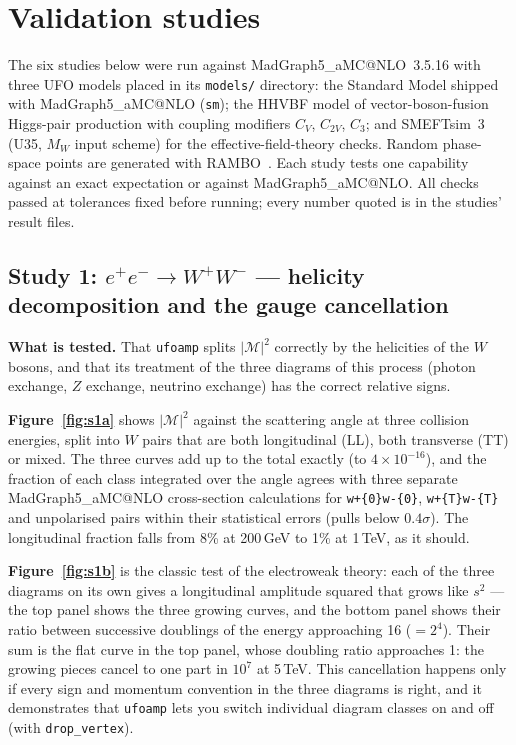 \documentclass[11pt]{article}
\makeatletter
\newcommand{\ufoamp}{\texttt{ufoamp}}
\newcommand{\mg}{MadGraph5\_aMC@NLO}
\newcommand{\code}[1]{\texttt{#1}}
\newcommand{\M}{\mathcal{M}}
\makeatother
\begin{document}
\section{Validation studies}\label{sec:studies}
The six studies below were run against \mg{}~3.5.16 with three UFO models placed in its \code{models/} directory: the Standard Model shipped with \mg{} (\code{sm}); the HHVBF model of vector-boson-fusion Higgs-pair production with coupling modifiers $C_V$, $C_{2V}$, $C_3$; and SMEFTsim~3~\cite{Brivio:2020onw} (U35, $M_W$ input scheme) for the effective-field-theory checks. Random phase-space points are generated with RAMBO~\cite{Kleiss:1985gy}. Each study tests one capability against an exact expectation or against \mg. All checks passed at tolerances fixed before running; every number quoted is in the studies' result files.

\subsection{Study 1: $e^+e^-\to W^+W^-$ --- helicity decomposition and the gauge cancellation}
\textbf{What is tested.} That \ufoamp{} splits $|\M|^2$ correctly by the helicities of the $W$ bosons, and that its treatment of the three diagrams of this process (photon exchange, $Z$ exchange, neutrino exchange) has the correct relative signs.

\textbf{Figure~\ref{fig:s1a}} shows $|\M|^2$ against the scattering angle at three collision energies, split into $W$ pairs that are both longitudinal (LL), both transverse (TT) or mixed. The three curves add up to the total exactly (to $4\times10^{-16}$), and the fraction of each class integrated over the angle agrees with three separate \mg{} cross-section calculations for \code{w+\{0\}w-\{0\}}, \code{w+\{T\}w-\{T\}} and unpolarised pairs within their statistical errors (pulls below $0.4\sigma$). The longitudinal fraction falls from 8\% at 200\,GeV to 1\% at 1\,TeV, as it should.

\textbf{Figure~\ref{fig:s1b}} is the classic test of the electroweak theory: each of the three diagrams on its own gives a longitudinal amplitude squared that grows like $s^2$ --- the top panel shows the three growing curves, and the bottom panel shows their ratio between successive doublings of the energy approaching 16 ($=2^4$). Their sum is the flat curve in the top panel, whose doubling ratio approaches 1: the growing pieces cancel to one part in $10^7$ at 5\,TeV. This cancellation happens only if every sign and momentum convention in the three diagrams is right, and it demonstrates that \ufoamp{} lets you switch individual diagram classes on and off (with \code{drop\_vertex}).
\end{document}
